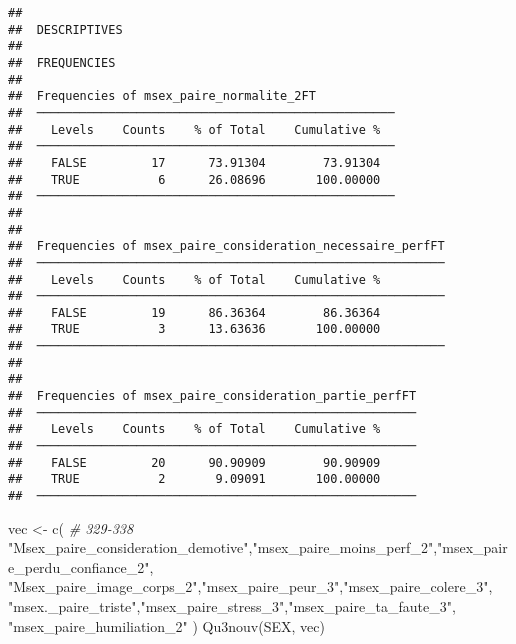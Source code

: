\documentclass[
]{article}
\newenvironment{Shaded}{\begin{snugshade}}{\end{snugshade}}
\newcommand{\CommentTok}[1]{\textcolor[rgb]{0.56,0.35,0.01}{\textit{#1}}}
\newcommand{\FunctionTok}[1]{\textcolor[rgb]{0.00,0.00,0.00}{#1}}
\newcommand{\NormalTok}[1]{#1}
\newcommand{\OtherTok}[1]{\textcolor[rgb]{0.56,0.35,0.01}{#1}}
\newcommand{\StringTok}[1]{\textcolor[rgb]{0.31,0.60,0.02}{#1}}
\begin{document}
\begin{verbatim}
## 
##  DESCRIPTIVES
## 
##  FREQUENCIES
## 
##  Frequencies of msex_paire_normalite_2FT            
##  ────────────────────────────────────────────────── 
##    Levels    Counts    % of Total    Cumulative %   
##  ────────────────────────────────────────────────── 
##    FALSE         17      73.91304        73.91304   
##    TRUE           6      26.08696       100.00000   
##  ────────────────────────────────────────────────── 
## 
## 
##  Frequencies of msex_paire_consideration_necessaire_perfFT 
##  ───────────────────────────────────────────────────────── 
##    Levels    Counts    % of Total    Cumulative %   
##  ───────────────────────────────────────────────────────── 
##    FALSE         19      86.36364        86.36364   
##    TRUE           3      13.63636       100.00000   
##  ───────────────────────────────────────────────────────── 
## 
## 
##  Frequencies of msex_paire_consideration_partie_perfFT 
##  ───────────────────────────────────────────────────── 
##    Levels    Counts    % of Total    Cumulative %   
##  ───────────────────────────────────────────────────── 
##    FALSE         20      90.90909        90.90909   
##    TRUE           2       9.09091       100.00000   
##  ─────────────────────────────────────────────────────
\end{verbatim}

\begin{Shaded}
\begin{Highlighting}[]
\NormalTok{vec }\OtherTok{\textless{}{-}} \FunctionTok{c}\NormalTok{(   }\CommentTok{\# 329{-}338}
  \StringTok{"Msex\_paire\_consideration\_demotive"}\NormalTok{,}\StringTok{"msex\_paire\_moins\_perf\_2"}\NormalTok{,}\StringTok{"msex\_paire\_perdu\_confiance\_2"}\NormalTok{,}
  \StringTok{"Msex\_paire\_image\_corps\_2"}\NormalTok{,}\StringTok{"msex\_paire\_peur\_3"}\NormalTok{,}\StringTok{"msex\_paire\_colere\_3"}\NormalTok{,}
  \StringTok{"msex.\_paire\_triste"}\NormalTok{,}\StringTok{"msex\_paire\_stress\_3"}\NormalTok{,}\StringTok{"msex\_paire\_ta\_faute\_3"}\NormalTok{,}
  \StringTok{"msex\_paire\_humiliation\_2"}
\NormalTok{  )}
\FunctionTok{Qu3nouv}\NormalTok{(SEX, vec)}
\end{Highlighting}
\end{Shaded}
\end{document}
